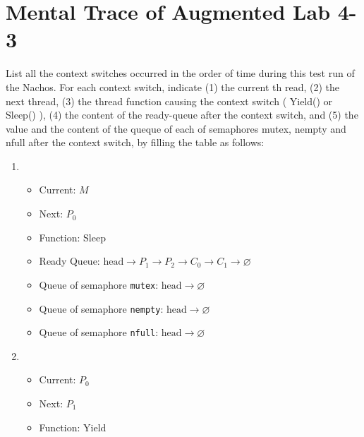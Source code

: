 \documentclass[11pt]{article}
\begin{document}
    \section{Mental Trace of Augmented Lab 4-3}
    \setcounter{qsection}{0}
    \begin{question}

        List all the context switches occurred in the order of time during this test run of the Nachos. For each context switch, indicate (1) the current th read, (2) the next thread, (3) the thread function causing the context switch ( Yield() or Sleep() ), (4) the content of the ready-queue after the context switch, and (5) the value and the content of the queque of each of semaphores mutex, nempty and nfull after the context switch, by filling the table as follows:

        \begin{enumerate}
            \item {
                \begin{itemize}
                    \item{Current: $M$}
                    \item{Next: $P_{0}$}
                    \item{Function: Sleep}
                    \item{
                        Ready Queue: $\text{head}\longrightarrow
                        P_{1}\longrightarrow
                        P_{2}\longrightarrow
                        C_{0}\longrightarrow
                        C_{1}\longrightarrow\varnothing$
                    } \item{
                        Queue of semaphore {\tt mutex}: $\text{head}\longrightarrow\varnothing$
                    }
                    \item{
                        Queue of semaphore {\tt nempty}: $\text{head}\longrightarrow\varnothing$
                    }
                    \item{
                        Queue of semaphore {\tt nfull}: $\text{head}\longrightarrow\varnothing$
                    }
                \end{itemize}
            }
            \item {
                \begin{itemize}
                    \item{Current: $P_{0}$}
                    \item{Next: $P_{1}$}
                    \item{Function: Yield}

\end{itemize}}
\end{enumerate}
\end{question}
\end{document}
